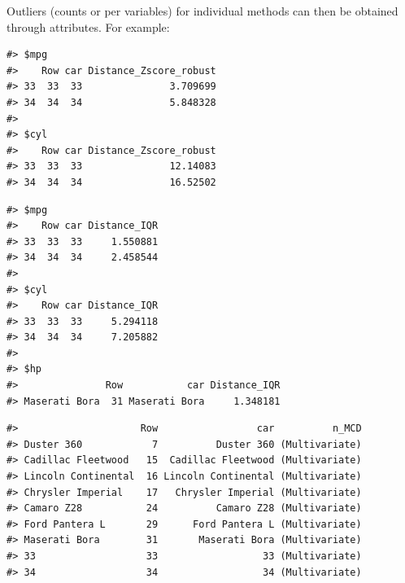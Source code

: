 \documentclass[
]{article}
\newenvironment{Shaded}{\begin{snugshade}}{\end{snugshade}}
\newcommand{\FunctionTok}[1]{\textcolor[rgb]{0.00,0.00,0.00}{#1}}
\newcommand{\NormalTok}[1]{#1}
\newcommand{\SpecialCharTok}[1]{\textcolor[rgb]{0.00,0.00,0.00}{#1}}
\begin{document}
Outliers (counts or per variables) for individual methods can then be obtained through attributes. For example:

\begin{Shaded}
\end{Shaded}

\begin{verbatim}
#> $mpg
#>    Row car Distance_Zscore_robust
#> 33  33  33               3.709699
#> 34  34  34               5.848328
#> 
#> $cyl
#>    Row car Distance_Zscore_robust
#> 33  33  33               12.14083
#> 34  34  34               16.52502
\end{verbatim}

\begin{Shaded}
\end{Shaded}

\begin{verbatim}
#> $mpg
#>    Row car Distance_IQR
#> 33  33  33     1.550881
#> 34  34  34     2.458544
#> 
#> $cyl
#>    Row car Distance_IQR
#> 33  33  33     5.294118
#> 34  34  34     7.205882
#> 
#> $hp
#>               Row           car Distance_IQR
#> Maserati Bora  31 Maserati Bora     1.348181
\end{verbatim}

\begin{Shaded}
\end{Shaded}

\begin{verbatim}
#>                     Row                 car          n_MCD
#> Duster 360            7          Duster 360 (Multivariate)
#> Cadillac Fleetwood   15  Cadillac Fleetwood (Multivariate)
#> Lincoln Continental  16 Lincoln Continental (Multivariate)
#> Chrysler Imperial    17   Chrysler Imperial (Multivariate)
#> Camaro Z28           24          Camaro Z28 (Multivariate)
#> Ford Pantera L       29      Ford Pantera L (Multivariate)
#> Maserati Bora        31       Maserati Bora (Multivariate)
#> 33                   33                  33 (Multivariate)
#> 34                   34                  34 (Multivariate)
\end{verbatim}
\end{document}
